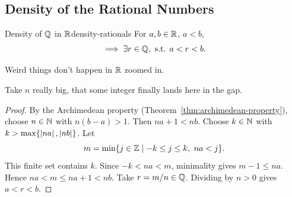 \subsection{Density of the Rational Numbers}

\begin{theorem}{Density of $\mathbb{Q}$ in $\mathbb{R}$}{density-rationals}
  For $a,b\in\mathbb{R}$, $a<b$,
  \[
    \implies\exists r\in\mathbb{Q},\text{ s.t. }a<r<b.
  \]
\end{theorem}

\begin{thinking}
  Weird things don't happen in $\mathbb{R}$ zoomed in.
\end{thinking}

\begin{thinking}
  \begin{flushleft}
  \end{flushleft}

  Take $n$ really big, that
  some integer finally lands here in the gap.
  \begin{center}
  \end{center}
\end{thinking}

\begin{proof}
  By the Archimedean property (Theorem~\ref{thm:archimedean-property}),
  choose $n\in\mathbb{N}$ with $n(b-a)>1$. Then $na+1<nb$.
  Choose $k\in\mathbb{N}$ with $k>\max\{\left\lvert na \right\rvert,\left\lvert nb \right\rvert\}$. Let
  \[
    m=\min\{j\in\Z\mid -k\le j\le k,\ na<j\}.
  \]
  This finite set contains $k$. Since $-k<na<m$, minimality gives $m-1\le na$.
  Hence $na<m\le na+1<nb$. Take $r=m/n\in\mathbb{Q}$. Dividing by $n>0$ gives $a<r<b$.
\end{proof}
